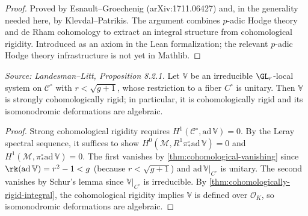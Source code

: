 \begin{proof}
  Proved by Esnault--Groechenig (arXiv:1711.06427) and, in the generality
  needed here, by Klevdal--Patrikis.  The argument combines $p$-adic Hodge
  theory and de Rham cohomology to extract an integral structure from
  cohomological rigidity.  Introduced as an axiom in the Lean formalization;
  the relevant $p$-adic Hodge theory infrastructure is not yet in Mathlib.
\end{proof}

\begin{proposition}
  \label{lem:isomonodromy-rigidity}
  \textit{Source: Landesman--Litt, Proposition 8.2.1.}
  Let $\mathbb{V}$ be an irreducible $\GL_r$-local system on $\mathcal{C}^\circ$
  with $r < \sqrt{g+1}$, whose restriction to a fiber $C^\circ$ is unitary.
  Then $\mathbb{V}$ is strongly cohomologically rigid; in particular, it is
  cohomologically rigid and its isomonodromic deformations are algebraic.
\end{proposition}

\begin{proof}
  Strong cohomological rigidity requires $H^1(\mathcal{C}^\circ, \mathrm{ad}\,\mathbb{V}) = 0$.
  By the Leray spectral sequence, it suffices to show
  $H^0(\mathcal{M}, R^1\pi^\circ_* \mathrm{ad}\,\mathbb{V}) = 0$ and
  $H^1(\mathcal{M}, \pi^\circ_* \mathrm{ad}\,\mathbb{V}) = 0$.
  The first vanishes by \cref{thm:cohomological-vanishing} since
  $\rk(\mathrm{ad}\,\mathbb{V}) = r^2-1 < g$ (because $r < \sqrt{g+1}$) and
  $\mathrm{ad}\,\mathbb{V}|_{C^\circ}$ is unitary.
  The second vanishes by Schur's lemma since $\mathbb{V}|_{C^\circ}$ is
  irreducible.
  By \cref{thm:cohomologically-rigid-integral}, the cohomological rigidity
  implies $\mathbb{V}$ is defined over $\mathcal{O}_K$, so isomonodromic
  deformations are algebraic.
\end{proof}

